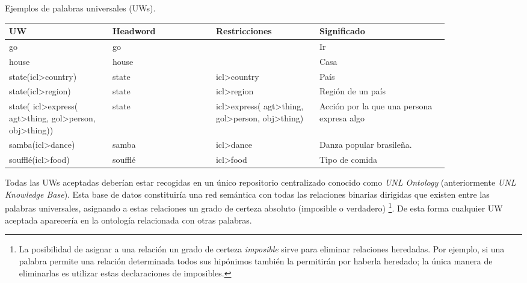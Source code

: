 \documentclass[a4paper,12pt,spanish]{book}
\begin{document}
\begin{threeparttable}
\capstart\caption{Ejemplos de palabras universales (UWs).}
\label{1.state-of-the-art/i.representacion-conocimiento:table-uws-example}
\begin{tabulary}{\linewidth}{|p{0.2\linewidth}|p{0.2\linewidth}|p{0.2\linewidth}|p{0.25\linewidth}|}
\hline
\textsf{\relax 
\textbf{UW}
} & \textsf{\relax 
\textbf{Headword}
} & \textsf{\relax 
\textbf{Restricciones}
} & \textsf{\relax 
\textbf{Significado}
}\\
\hline
go
 & 
go
 &  & 
Ir
\\
\hline
house
 & 
house
 &  & 
Casa
\\
\hline
state(icl\textgreater{}country)
 & 
state
 & 
icl\textgreater{}country
 & 
País
\\
\hline
state(icl\textgreater{}region)
 & 
state
 & 
icl\textgreater{}region
 & 
Región de un país
\\
\hline
state( icl\textgreater{}express( agt\textgreater{}thing, gol\textgreater{}person, obj\textgreater{}thing))
 & 
state
 & 
icl\textgreater{}express( agt\textgreater{}thing, gol\textgreater{}person, obj\textgreater{}thing)
 & 
Acción por la que una persona expresa algo
\\
\hline
samba(icl\textgreater{}dance)
 & 
samba
 & 
icl\textgreater{}dance
 & 
Danza popular brasileña.
\\
\hline
soufflé(icl\textgreater{}food)
 & 
soufflé
 & 
icl\textgreater{}food
 & 
Tipo de comida
\\
\hline\end{tabulary}

\end{threeparttable}


Todas las UWs aceptadas deberían estar recogidas en un único repositorio centralizado conocido
como \emph{UNL Ontology} (anteriormente \emph{UNL Knowledge Base}). Esta base de datos constituiría una red
semántica con todas las relaciones binarias dirigidas que existen entre las palabras universales,  asignando a estas relaciones un grado de certeza absoluto (imposible o verdadero) \footnote{
La posibilidad de asignar a una relación un grado de certeza \emph{imposible} sirve para
eliminar relaciones heredadas. Por ejemplo, si una palabra permite una relación determinada
todos sus hipónimos también la permitirán por haberla heredado; la única manera de eliminarlas
es utilizar estas declaraciones de imposibles.
}.
De esta forma cualquier UW aceptada aparecería en la ontología relacionada con otras palabras.
\end{document}
